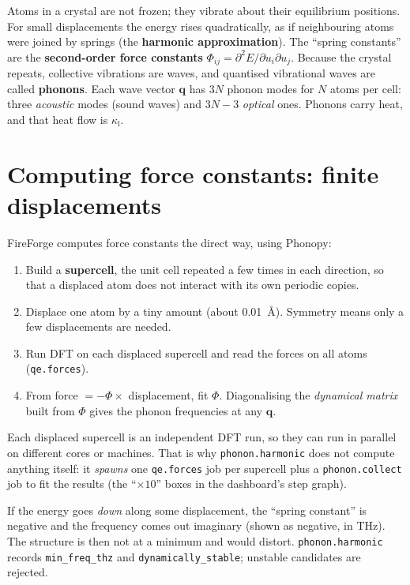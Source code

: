 \documentclass[11pt,a4paper]{report}
\newcommand{\code}[1]{\texttt{#1}}
\newcommand{\kl}{\kappa_\mathrm{l}}
\begin{document}
Atoms in a crystal are not frozen; they vibrate about their equilibrium positions. For small
displacements the energy rises quadratically, as if neighbouring atoms were joined by springs
(the \textbf{harmonic approximation}). The ``spring constants'' are the \textbf{second-order
force constants} $\Phi_{ij}=\partial^2E/\partial u_i\partial u_j$. Because the crystal repeats,
collective vibrations are waves, and quantised vibrational waves are called \textbf{phonons}.
Each wave vector $\mathbf q$ has $3N$ phonon modes for $N$ atoms per cell: three
\emph{acoustic} modes (sound waves) and $3N-3$ \emph{optical} ones. Phonons carry heat, and
that heat flow is $\kl$.

\section{Computing force constants: finite displacements}

FireForge computes force constants the direct way, using Phonopy:
\begin{enumerate}
\item Build a \textbf{supercell}, the unit cell repeated a few times in each direction, so that a
  displaced atom does not interact with its own periodic copies.
\item Displace one atom by a tiny amount (about \SI{0.01}{\angstrom}). Symmetry means only a few
  displacements are needed.
\item Run DFT on each displaced supercell and read the forces on all atoms
  (\code{qe.forces}).
\item From force $=-\Phi\times$ displacement, fit $\Phi$. Diagonalising the
  \emph{dynamical matrix} built from $\Phi$ gives the phonon frequencies at any $\mathbf q$.
\end{enumerate}

Each displaced supercell is an independent DFT run, so they can run in parallel on different
cores or machines. That is why \code{phonon.harmonic} does not compute anything itself: it
\emph{spawns} one \code{qe.forces} job per supercell plus a \code{phonon.collect} job to fit the
results (the ``$\times10$'' boxes in the dashboard's step graph).

\begin{keyidea}
If the energy goes \emph{down} along some displacement, the ``spring constant'' is negative and
the frequency comes out imaginary (shown as negative, in THz). The structure is then not at a
minimum and would distort. \code{phonon.harmonic} records \code{min\_freq\_thz} and
\code{dynamically\_stable}; unstable candidates are rejected.
\end{keyidea}
\end{document}
